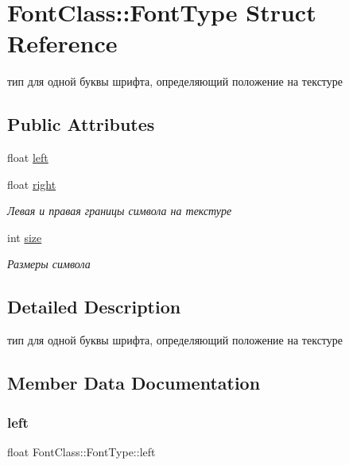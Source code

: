 \hypertarget{struct_font_class_1_1_font_type}{}\section{Font\+Class\+:\+:Font\+Type Struct Reference}
\label{struct_font_class_1_1_font_type}


тип для одной буквы шрифта, определяющий положение на текстуре  


\subsection*{Public Attributes}
\begin{DoxyCompactItemize}
\item 
float \hyperlink{struct_font_class_1_1_font_type_a2a34db4b9888cb088705327788191e0f}{left}
\item 
float \hyperlink{struct_font_class_1_1_font_type_a5843dac0db845ade46cc6d5d0732dba0}{right}
\begin{DoxyCompactList}\small\item\em Левая и правая границы символа на текстуре \end{DoxyCompactList}\item 
int \hyperlink{struct_font_class_1_1_font_type_a0a02700a2880953d72b9e198822997a6}{size}
\begin{DoxyCompactList}\small\item\em Размеры символа \end{DoxyCompactList}\end{DoxyCompactItemize}


\subsection{Detailed Description}
тип для одной буквы шрифта, определяющий положение на текстуре 

\subsection{Member Data Documentation}
\mbox{\label{struct_font_class_1_1_font_type_a2a34db4b9888cb088705327788191e0f}} 
\subsubsection{\texorpdfstring{left}{left}}
{\footnotesize\ttfamily float Font\+Class\+::\+Font\+Type\+::left}

